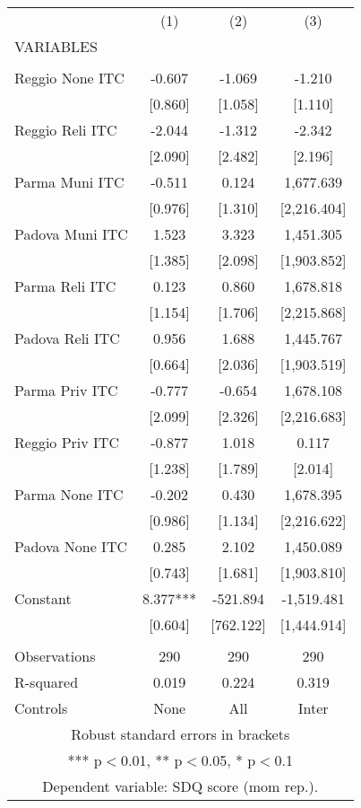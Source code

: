\begin{tabular}{lccc} \hline
 & (1) & (2) & (3) \\
VARIABLES &  &  &  \\ \hline
 &  &  &  \\
Reggio None ITC & -0.607 & -1.069 & -1.210 \\
 & [0.860] & [1.058] & [1.110] \\
Reggio Reli ITC & -2.044 & -1.312 & -2.342 \\
 & [2.090] & [2.482] & [2.196] \\
Parma Muni ITC & -0.511 & 0.124 & 1,677.639 \\
 & [0.976] & [1.310] & [2,216.404] \\
Padova Muni ITC & 1.523 & 3.323 & 1,451.305 \\
 & [1.385] & [2.098] & [1,903.852] \\
Parma Reli ITC & 0.123 & 0.860 & 1,678.818 \\
 & [1.154] & [1.706] & [2,215.868] \\
Padova Reli ITC & 0.956 & 1.688 & 1,445.767 \\
 & [0.664] & [2.036] & [1,903.519] \\
Parma Priv ITC & -0.777 & -0.654 & 1,678.108 \\
 & [2.099] & [2.326] & [2,216.683] \\
Reggio Priv ITC & -0.877 & 1.018 & 0.117 \\
 & [1.238] & [1.789] & [2.014] \\
Parma None ITC & -0.202 & 0.430 & 1,678.395 \\
 & [0.986] & [1.134] & [2,216.622] \\
Padova None ITC & 0.285 & 2.102 & 1,450.089 \\
 & [0.743] & [1.681] & [1,903.810] \\
Constant & 8.377*** & -521.894 & -1,519.481 \\
 & [0.604] & [762.122] & [1,444.914] \\
 &  &  &  \\
Observations & 290 & 290 & 290 \\
R-squared & 0.019 & 0.224 & 0.319 \\
 Controls & None & All & Inter \\ \hline
\multicolumn{4}{c}{ Robust standard errors in brackets} \\
\multicolumn{4}{c}{ *** p$<$0.01, ** p$<$0.05, * p$<$0.1} \\
\multicolumn{4}{c}{ Dependent variable: SDQ score (mom rep.).} \\
\end{tabular}
